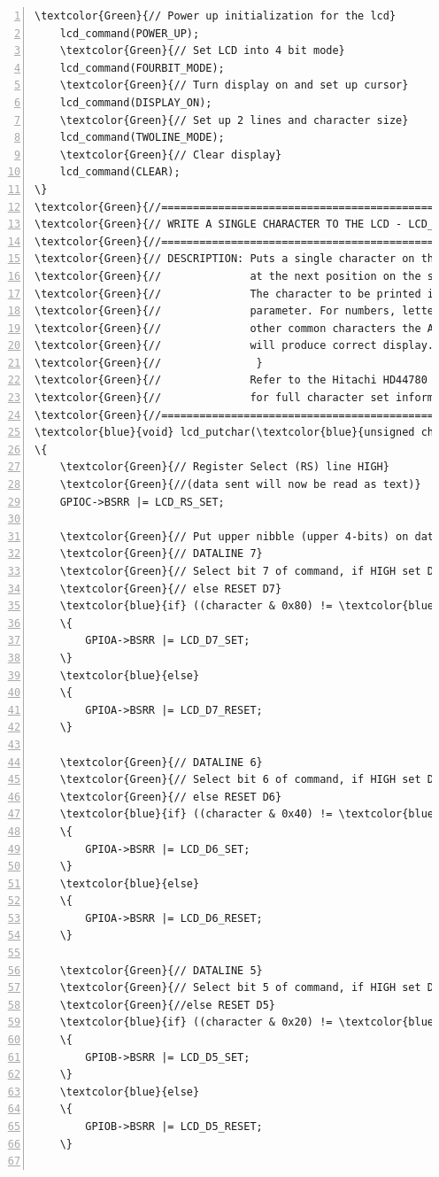 \begin{Verbatim}[fontfamily=courier,fontsize=\small, numbers=left,commandchars=\\\{\}]
	\textcolor{Green}{// Power up initialization for the lcd}
	lcd_command(POWER_UP);                    
	\textcolor{Green}{// Set LCD into 4 bit mode}
	lcd_command(FOURBIT_MODE);                
	\textcolor{Green}{// Turn display on and set up cursor}
	lcd_command(DISPLAY_ON);                  
	\textcolor{Green}{// Set up 2 lines and character size}
	lcd_command(TWOLINE_MODE);                
	\textcolor{Green}{// Clear display}
	lcd_command(CLEAR);                       
\}
\textcolor{Green}{//=================================================}
\textcolor{Green}{// WRITE A SINGLE CHARACTER TO THE LCD - LCD_PutChar(character)}
\textcolor{Green}{//=================================================}
\textcolor{Green}{// DESCRIPTION: Puts a single character on the LCD }
\textcolor{Green}{//              at the next position on the screen. }
\textcolor{Green}{//              The character to be printed is in the input}
\textcolor{Green}{//              parameter. For numbers, letters and}
\textcolor{Green}{//              other common characters the ASCII code }
\textcolor{Green}{//              will produce correct display.}
\textcolor{Green}{//               }
\textcolor{Green}{//              Refer to the Hitachi HD44780 datasheet }
\textcolor{Green}{//              for full character set information.}
\textcolor{Green}{//=================================================}
\textcolor{blue}{void} lcd_putchar(\textcolor{blue}{unsigned char} character)
\{
	\textcolor{Green}{// Register Select (RS) line HIGH} 
	\textcolor{Green}{//(data sent will now be read as text)}
	GPIOC->BSRR |= LCD_RS_SET;			  
	    
	\textcolor{Green}{// Put upper nibble (upper 4-bits) on data lines, command mode} 
	\textcolor{Green}{// DATALINE 7}
	\textcolor{Green}{// Select bit 7 of command, if HIGH set Data line 7 (D7)}
	\textcolor{Green}{// else RESET D7}
	\textcolor{blue}{if} ((character & 0x80) != \textcolor{blue}{0}) 				         
	\{
		GPIOA->BSRR |= LCD_D7_SET;
	\}
	\textcolor{blue}{else}
	\{
		GPIOA->BSRR |= LCD_D7_RESET;
	\}

	\textcolor{Green}{// DATALINE 6}
	\textcolor{Green}{// Select bit 6 of command, if HIGH set Data line 6 (D6)}
	\textcolor{Green}{// else RESET D6}
	\textcolor{blue}{if} ((character & 0x40) != \textcolor{blue}{0})			
	\{
		GPIOA->BSRR |= LCD_D6_SET;
	\}
	\textcolor{blue}{else}
	\{
		GPIOA->BSRR |= LCD_D6_RESET;
	\}

	\textcolor{Green}{// DATALINE 5}
	\textcolor{Green}{// Select bit 5 of command, if HIGH set Data line 5 (D5)} 
	\textcolor{Green}{//else RESET D5}
	\textcolor{blue}{if} ((character & 0x20) != \textcolor{blue}{0})
	\{
		GPIOB->BSRR |= LCD_D5_SET;  
	\}
	\textcolor{blue}{else}
	\{
		GPIOB->BSRR |= LCD_D5_RESET;
	\}
        

\end{Verbatim}
